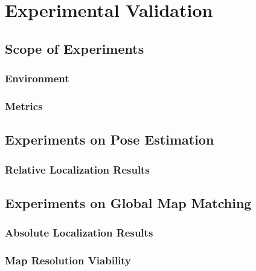 \label{Chapter4}

\chapter{Experimental Validation}

\section{Scope of Experiments}

\subsection{Environment}

\subsection{Metrics}

\section{Experiments on Pose Estimation}

\subsection{Relative Localization Results}

\section{Experiments on Global Map Matching}

\subsection{Absolute Localization Results}

\subsection{Map Resolution Viability}

